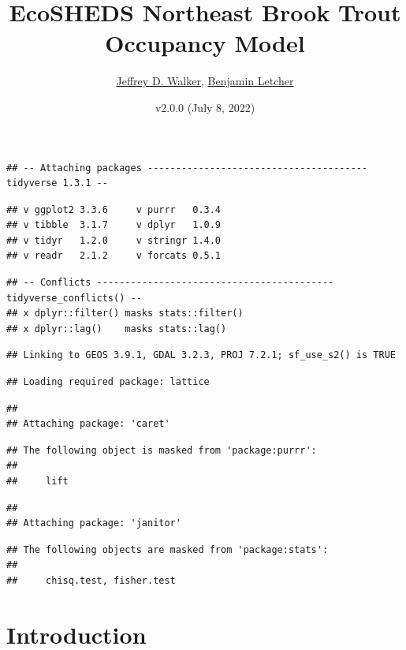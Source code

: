 \documentclass[
]{book}
\title{EcoSHEDS Northeast Brook Trout Occupancy Model}
\author{\href{https://walkerenvres.com}{Jeffrey D. Walker}, \href{https://www.usgs.gov/staff-profiles/benjamin-h-letcher}{Benjamin Letcher}}
\date{v2.0.0 (July 8, 2022)}
\begin{document}
\maketitle

{
\setcounter{tocdepth}{1}
\tableofcontents
}
\begin{verbatim}
## -- Attaching packages --------------------------------------- tidyverse 1.3.1 --
\end{verbatim}

\begin{verbatim}
## v ggplot2 3.3.6     v purrr   0.3.4
## v tibble  3.1.7     v dplyr   1.0.9
## v tidyr   1.2.0     v stringr 1.4.0
## v readr   2.1.2     v forcats 0.5.1
\end{verbatim}

\begin{verbatim}
## -- Conflicts ------------------------------------------ tidyverse_conflicts() --
## x dplyr::filter() masks stats::filter()
## x dplyr::lag()    masks stats::lag()
\end{verbatim}

\begin{verbatim}
## Linking to GEOS 3.9.1, GDAL 3.2.3, PROJ 7.2.1; sf_use_s2() is TRUE
\end{verbatim}

\begin{verbatim}
## Loading required package: lattice
\end{verbatim}

\begin{verbatim}
## 
## Attaching package: 'caret'
\end{verbatim}

\begin{verbatim}
## The following object is masked from 'package:purrr':
## 
##     lift
\end{verbatim}

\begin{verbatim}
## 
## Attaching package: 'janitor'
\end{verbatim}

\begin{verbatim}
## The following objects are masked from 'package:stats':
## 
##     chisq.test, fisher.test
\end{verbatim}

\hypertarget{intro}{%
\chapter{Introduction}\label{intro}}
\end{document}
